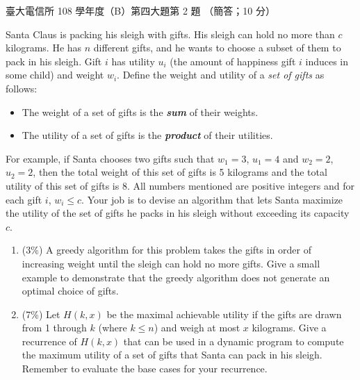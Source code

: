 \begin{pastexam}[label={px:ntu-108-comm-dsab-35}]{臺大電信所 108 學年度（B）第四大題第 2 題}
（簡答；10 分）

Santa Claus is packing his sleigh with gifts. His sleigh can hold no more than $c$ kilograms. He
has $n$ different gifts, and he wants to choose a subset of them to pack in his sleigh. Gift $i$
has utility $u_i$ (the amount of happiness gift $i$ induces in some child) and weight $w_i$.
Define the weight and utility of a \textit{set of gifts} as follows:
\begin{itemize}
\item The weight of a set of gifts is the \textbf{\textit{sum}} of their weights.
\item The utility of a set of gifts is the \textbf{\textit{product}} of their utilities.
\end{itemize}
For example, if Santa chooses two gifts such that $w_1=3$, $u_1=4$ and $w_2=2$, $u_2=2$, then the
total weight of this set of gifts is 5 kilograms and the total utility of this set of gifts is 8.
All numbers mentioned are positive integers and for each gift $i$, $w_i\le c$. Your job is to devise
an algorithm that lets Santa maximize the utility of the set of gifts he packs in his sleigh without
exceeding its capacity $c$.
\begin{enumerate}[label=(\alph*)]
\item (3\%) A greedy algorithm for this problem takes the gifts in order of increasing weight until
the sleigh can hold no more gifts. Give a small example to demonstrate that the greedy algorithm
does not generate an optimal choice of gifts.
\item (7\%) Let $H(k,x)$ be the maximal achievable utility if the gifts are drawn from 1 through
$k$ (where $k\le n$) and weigh at most $x$ kilograms. Give a recurrence of $H(k,x)$ that can be used
in a dynamic program to compute the maximum utility of a set of gifts that Santa can pack in his
sleigh. Remember to evaluate the base cases for your recurrence.
\end{enumerate}
\end{pastexam}

